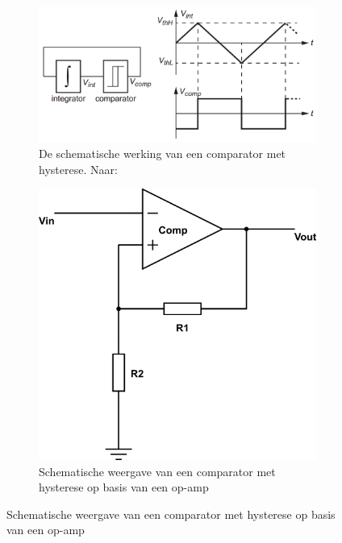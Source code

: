 \documentclass{report}
\begin{document}
\begin{figure}[H]
	\centering
	\begin{subfigure}{0.5\textwidth}
		\centering
		\includegraphics[width=\textwidth]{comparator-werking.png}
		\caption{De schematische werking van een comparator met hysterese. Naar: \cite{epo2-opamps}}
		\label{fig:comp-werk}
	\end{subfigure}
	\begin{subfigure}{0.4\textwidth}
		\centering
		\includegraphics[width=\textwidth]{comparator.png}
		\caption{Schematische weergave van een comparator met hysterese op basis van een op-amp}
		\label{fig:comp}
	\end{subfigure}
\end{figure}
\end{document}
